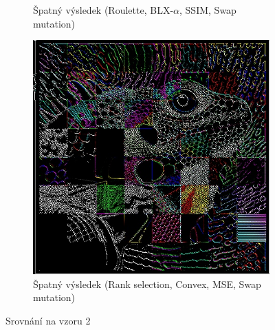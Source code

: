 \documentclass[a4paper,11pt,titlepage]{scrartcl}
\begin{document}
\begin{figure}[!h]
\begin{subfigure}[b]{0.32\textwidth}
        \caption{Špatný výsledek (Roulette, BLX-$\alpha$, SSIM, Swap mutation)}
        \label{fig:ex22}
    \end{subfigure}
    \begin{subfigure}[b]{0.32\textwidth}
        \includegraphics[width=\textwidth]{img/ranksel-convex-mse-swap_example2.jpg}
        \caption{Špatný výsledek (Rank selection, Convex, MSE, Swap mutation)}
        \label{fig:ex23}
    \end{subfigure}
    \caption{Srovnání na vzoru 2}
    \label{porovnani_ex2}
\end{figure}
\end{document}
